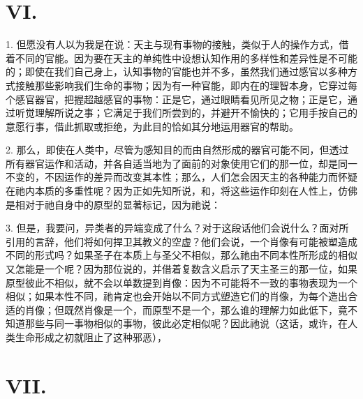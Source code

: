 
\section{VI. }

1. 但愿没有人以为我是在说：天主与现有事物的接触，类似于人的操作方式，借着不同的官能。因为要在天主的单纯性中设想认知作用的多样性和差异性是不可能的；即使在我们自己身上，认知事物的官能也并不多，虽然我们通过感官以多种方式接触那些影响我们生命的事物；因为有一种官能，即内在的理智本身，它穿过每个感官器官，把握超越感官的事物：正是它，通过眼睛看见所见之物；正是它，通过听觉理解所说之事；它满足于我们所尝到的，并避开不愉快的；它用手按自己的意愿行事，借此抓取或拒绝，为此目的恰如其分地运用器官的帮助。\par

2. 那么，即使在人类中，尽管为感知目的而由自然形成的器官可能不同，但透过所有器官运作和活动，并各自适当地为了面前的对象使用它们的那一位，却是同一不变的，不因运作的差异而改变其本性；那么，人们怎会因天主的各种能力而怀疑在祂内本质的多重性呢？因为正如先知所说，和，将这些运作印刻在人性上，仿佛是相对于祂自身中的原型的显著标记，因为祂说：\par

3. 但是，我要问，异类者的异端变成了什么？对于这段话他们会说什么？面对所引用的言辞，他们将如何捍卫其教义的空虚？他们会说，一个肖像有可能被塑造成不同的形式吗？如果圣子在本质上与圣父不相似，那么祂由不同本性所形成的相似又怎能是一个呢？因为那位说的，并借着复数含义启示了天主圣三的那一位，如果原型彼此不相似，就不会以单数提到肖像：因为不可能将不一致的事物表现为一个相似；如果本性不同，祂肯定也会开始以不同方式塑造它们的肖像，为每个造出合适的肖像；但既然肖像是一个，而原型不是一个，那么谁的理解力如此低下，竟不知道那些与同一事物相似的事物，彼此必定相似呢？因此祂说（这话，或许，在人类生命形成之初就阻止了这种邪恶），\par


\section{VII. }

